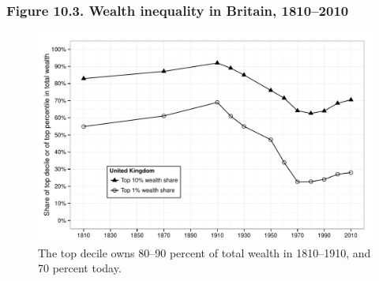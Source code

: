\documentclass[t]{beamer}\usepackage[]{graphicx}\usepackage[]{color}
\newenvironment{knitrout}{}{} %
\begin{document}
\begin{frame}[label=Figure_10_3]
\frametitle{Figure 10.3. Wealth inequality in Britain, 1810--2010}
\begin{figure}[t]
\begin{minipage}[b]{\textwidth}
\centering
\begin{knitrout}\footnotesize
{}\color{fgcolor}

{\centering \includegraphics[width=1\linewidth]{figures/bw/Figure_10_3} 

}



\end{knitrout}
\caption{The top decile owns 80--90 percent of total wealth in 1810--1910, and 70 percent today.}
\end{minipage}
\end{figure}
\end{frame}
\end{document}
